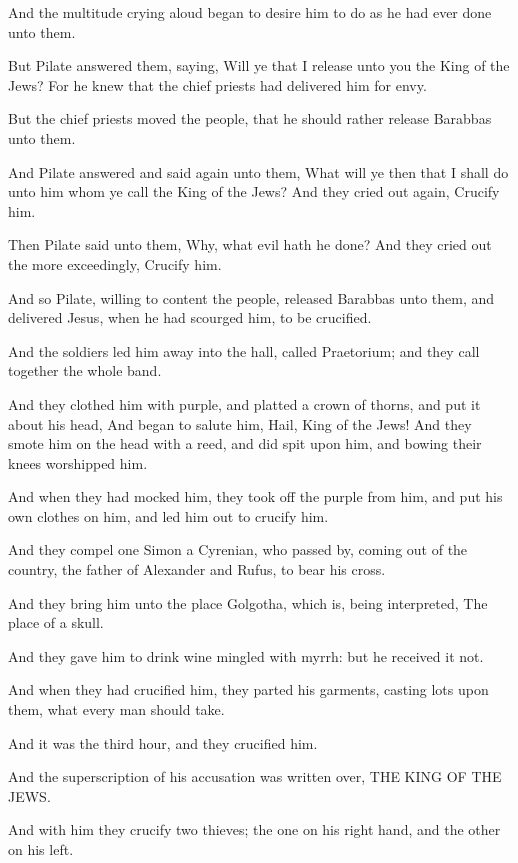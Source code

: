 \Verse And the multitude crying aloud began to desire him to do as he had ever done unto them.

\Verse But Pilate answered them, saying, Will ye that I release unto you the King of the Jews?  \Verse For he knew that the chief priests had delivered him for envy.

\Verse But the chief priests moved the people, that he should rather release Barabbas unto them.

\Verse And Pilate answered and said again unto them, What will ye then that I shall do unto him whom ye call the King of the Jews?  \Verse And they cried out again, Crucify him.

\Verse Then Pilate said unto them, Why, what evil hath he done? And they cried out the more exceedingly, Crucify him.

\Verse And so Pilate, willing to content the people, released Barabbas unto them, and delivered Jesus, when he had scourged him, to be crucified.

\Verse And the soldiers led him away into the hall, called Praetorium; and they call together the whole band.

\Verse And they clothed him with purple, and platted a crown of thorns, and put it about his head, \Verse And began to salute him, Hail, King of the Jews!  \Verse And they smote him on the head with a reed, and did spit upon him, and bowing their knees worshipped him.

\Verse And when they had mocked him, they took off the purple from him, and put his own clothes on him, and led him out to crucify him.

\Verse And they compel one Simon a Cyrenian, who passed by, coming out of the country, the father of Alexander and Rufus, to bear his cross.

\Verse And they bring him unto the place Golgotha, which is, being interpreted, The place of a skull.

\Verse And they gave him to drink wine mingled with myrrh: but he received it not.

\Verse And when they had crucified him, they parted his garments, casting lots upon them, what every man should take.

\Verse And it was the third hour, and they crucified him.

\Verse And the superscription of his accusation was written over, THE KING OF THE JEWS.

\Verse And with him they crucify two thieves; the one on his right hand, and the other on his left.


